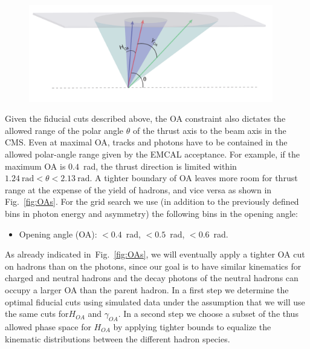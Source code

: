 \begin{figure}[H]
  \centering
  \includegraphics[width=0.95\textwidth,natwidth=610,natheight=642]{figure_dataselection/OA.pdf}
  \label{fig:FiducialCut}
\end{figure}
 Given the fiducial cuts described above, the OA constraint also dictates the allowed range of the polar angle $\theta$ of the thrust axis to the beam axis in the CMS.  Even at maximal OA, tracks and photons have to be contained in the allowed polar-angle range given by the EMCAL acceptance. For example, if the maximum OA is $0.4$~rad, the thrust direction is limited within $1.24~\text{rad}<\theta<2.13~\text{rad}$.  A tighter boundary of OA leaves more room for thrust range at the expense of the yield of hadrons, and vice versa as shown in Fig.~\ref{fig:OAs}. For the grid search we use (in addition to the previously defined bins in photon energy and asymmetry) the following bins in the opening angle:
\begin{itemize}
\item Opening angle (OA): $<0.4$~rad, $<0.5$~rad, $<0.6$~rad.
\end{itemize}

As already indicated in~Fig.~\ref{fig:OAs}, we will eventually apply a tighter OA cut on hadrons than on the photons, since our goal is to have similar kinematics for charged and neutral hadrons and the decay photons of the neutral hadrons can occupy a larger OA than the parent hadron. In a first step we determine the optimal fiducial cuts using simulated data under the assumption that we will use the same cuts for$H_{OA}$ and $\gamma_{OA}$.  In a second step we choose a subset of the thus allowed phase space for $H_{OA}$ by applying tighter bounds to equalize the kinematic distributions between the different hadron species.

